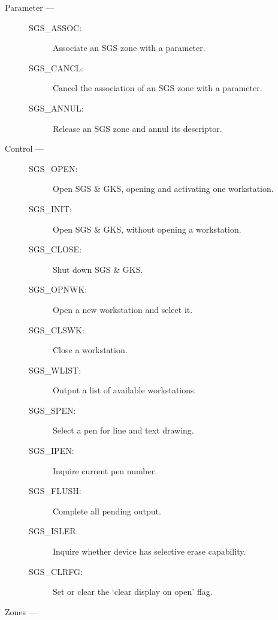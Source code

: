 \begin{description}

\item [Parameter ---]

\begin{description}
\item [SGS\_ASSOC:]  Associate an SGS zone with a parameter.
\item [SGS\_CANCL:]  Cancel the association of an SGS zone with a parameter.
\item [SGS\_ANNUL:]  Release an SGS zone and annul its descriptor.
\end{description}

\item [Control ---]

\begin{description}
\item [SGS\_OPEN:]  Open SGS \& GKS, opening and activating one workstation.
\item [SGS\_INIT:]  Open SGS \& GKS, without opening a workstation.
\item [SGS\_CLOSE:]  Shut down SGS \& GKS.
\item [SGS\_OPNWK:]  Open a new workstation and select it.
\item [SGS\_CLSWK:]  Close a workstation.
\item [SGS\_WLIST:]  Output a list of available workstations.
\item [SGS\_SPEN:]  Select a pen for line and text drawing.
\item [SGS\_IPEN:]  Inquire current pen number.
\item [SGS\_FLUSH:]  Complete all pending output.
\item [SGS\_ISLER:]  Inquire whether device has selective erase capability.
\item [SGS\_CLRFG:]  Set or clear the `clear display on open' flag.
\end{description}

\item [Zones ---]


\end{description}
